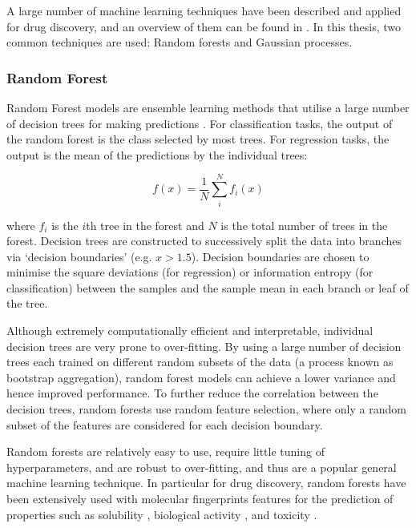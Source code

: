 A large number of machine learning techniques have been described and applied for drug discovery, and an overview of them can be found in \cite{Bender2021part1, Bender2021part2, Volkamer2023review}. In this thesis, two common techniques are used: Random forests and Gaussian processes.

\subsubsection{Random Forest}

Random Forest models are ensemble learning methods that utilise a large number of decision trees for making predictions \cite{Breiman2001RF}. For classification tasks, the output of the random forest is the class selected by most trees. For regression tasks, the output is the mean of the predictions by the individual trees:

\begin{equation}
 f(x) = \frac{1}{N}\sum^{N}_{i} f_{i}(x)
\end{equation}

where $f_{i}$ is the $i$th tree in the forest and $N$ is the total number of trees in the forest. Decision trees are constructed to successively split the data into branches via `decision boundaries' (e.g. $x > 1.5$). Decision boundaries are chosen to minimise the square deviations (for regression) or information entropy (for classification) between the samples and the sample mean in each branch or leaf of the tree. 

Although extremely computationally efficient and interpretable, individual decision trees are very prone to over-fitting. By using a large number of decision trees each trained on different random subsets of the data (a process known as bootstrap aggregation), random forest models can achieve a lower variance and hence improved performance. To further reduce the correlation between the decision trees, random forests use random feature selection, where only a random subset of the features are considered for each decision boundary. 

Random forests are relatively easy to use, require little tuning of hyperparameters, and are robust to over-fitting, and thus are a popular general machine learning technique. In particular for drug discovery, random forests have been extensively used with molecular fingerprints features for the prediction of properties such as solubility \cite{Palmer2007RandomForest}, biological activity \cite{Svetnik2003RandomForest, Merget2017KinaseInhibitors}, and toxicity \cite{Polishchuk2009RandomForest}.

